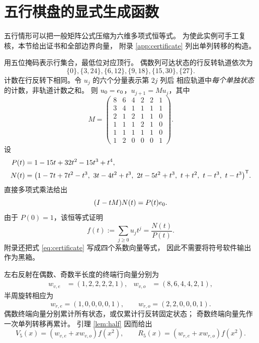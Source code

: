 \section{五行棋盘的显式生成函数}\label{sec:five}
五行情形可以把一般矩阵公式压缩为六维多项式恒等式。
为使此实例可手工复核，本节给出证书和全部边界向量，
附录 \ref{app:certificate} 列出单列转移的构造。

用五位掩码表示行集合，最低位对应顶行。
偶数列可达状态的行反转轨道依次为
\begin{equation}\label{eq:even-orbits}
 \{0\},\{3,24\},\{6,12\},\{9,18\},\{15,30\},\{27\}.
\end{equation}
计数在行反转下相同。令 $u_j$ 的六个分量表示第 $2j$ 列后
相应轨道中\emph{每个单独状态}的计数，非轨道计数之和。
则 $u_0=e_0$，$u_{j+1}=Mu_j$，其中
\begin{equation}\label{eq:M5}
 M=\begin{pmatrix}
8&6&4&2&2&1\\
3&4&1&1&1&1\\
2&1&2&1&1&0\\
1&1&1&2&1&0\\
1&1&1&1&1&0\\
1&2&0&0&0&1
\end{pmatrix}.
\end{equation}
设
\begin{equation}\label{eq:PN}
\begin{split}
 P(t)&=1-15t+32t^2-15t^3+t^4,\\
 N(t)&=\bigl(1-7t+7t^2-t^3,\ 
 3t-4t^2+t^3,\ 2t-5t^2+t^3,\ t+t^2,\ t-t^3,\ t-t^3\bigr)^{\trans}.
\end{split}
\end{equation}
直接多项式乘法给出
\begin{equation}\label{eq:certificate}
 (I-tM)N(t)=P(t)e_0.
\end{equation}
由于 $P(0)=1$，该恒等式证明
\[
 f(t):=\sum_{j\ge0}u_jt^j=\frac{N(t)}{P(t)}.
\]
附录还把式 \eqref{eq:certificate} 写成四个系数向量等式，
因此不需要将符号软件输出作为黑箱。

左右反射在偶数、奇数半长度的终端行向量分别为
\begin{align*}
 w_{v,e}&=(1,2,2,2,2,1),&w_{v,o}&=(8,6,4,4,2,1),
\end{align*}
半周旋转相应为
\[
 w_{r,e}=(1,0,0,0,0,1),\qquad w_{r,o}=(2,2,0,0,0,1).
\]
偶数终端向量分别累计所有状态，或仅累计行反转固定状态；
奇数终端向量先作一次单列转移再累计。
引理 \ref{lem:half} 因而给出
\begin{equation}\label{eq:terminal5}
 V_5(x)=(w_{v,e}+xw_{v,o})f(x^2),\qquad
 R_5(x)=(w_{r,e}+xw_{r,o})f(x^2).
\end{equation}

